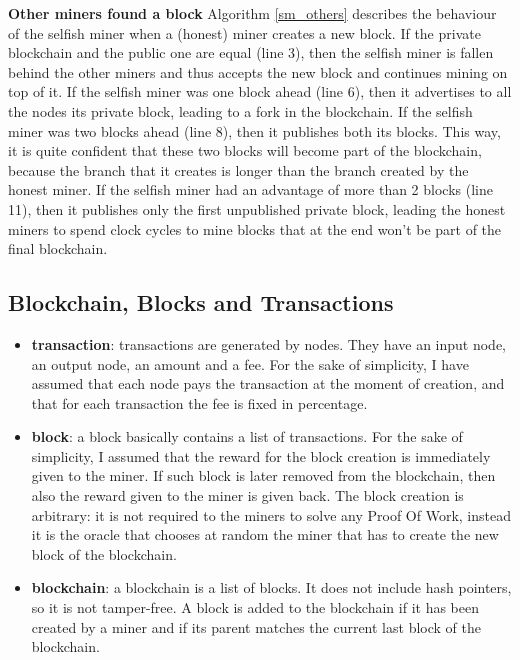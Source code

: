 \documentclass{article}
\begin{document}
\begin{itemize}
\textbf{Other miners found a block} Algorithm \ref{sm_others} describes the behaviour of the selfish miner when a (honest) miner creates a new block. If the private blockchain and the public one are equal (line 3), then the selfish miner is fallen behind the other miners and thus accepts the new block and continues mining on top of it. If the selfish miner was one block ahead (line 6), then it advertises to all the nodes its private block, leading to a fork in the blockchain. If the selfish miner was two blocks ahead (line 8), then it publishes both its blocks. This way, it is quite confident that these two blocks will become part of the blockchain, because the branch that it creates is longer than the branch created by the honest miner. If the selfish miner had an advantage of more than 2 blocks (line 11), then it publishes only the first unpublished private block, leading the honest miners to spend clock cycles to mine blocks that at the end won't be part of the final blockchain.
\end{itemize}





\subsection{Blockchain, Blocks and Transactions} 
\begin{itemize}
\item \textbf{transaction}: transactions are generated by nodes. They have an input node, an output node, an amount and a fee. For the sake of simplicity, I have assumed that each node pays the transaction at the moment of creation, and that for each transaction the fee is fixed in percentage.
\item{\textbf{block}}: a block basically contains a list of transactions. For the sake of simplicity, I assumed that the reward for the block creation is immediately given to the miner. If such block is later removed from the blockchain, then also the reward given to the miner is given back. The block creation is arbitrary: it is not required to the miners to solve any Proof Of Work, instead it is the oracle that chooses at random the miner that has to create the new block of the blockchain. 
\item{\textbf{blockchain}}: a blockchain is a list of blocks. It does not include hash pointers, so it is not tamper-free. A block is added to the blockchain if it has been created by a miner and if its parent matches the current last block of the blockchain.
\end{itemize}
\end{document}
